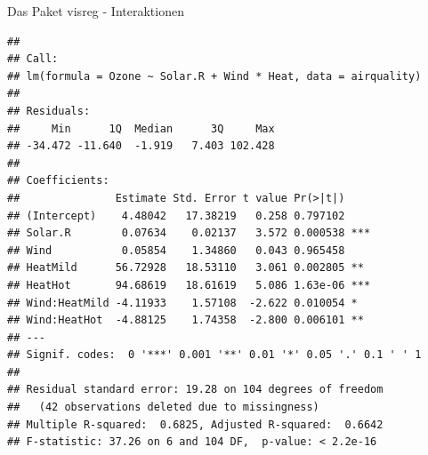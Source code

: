 \documentclass[ignorenonframetext,]{beamer}
\newenvironment{Shaded}{}{}
\newcommand{\KeywordTok}[1]{\textcolor[rgb]{0.00,0.44,0.13}{\textbf{{#1}}}}
\newcommand{\DataTypeTok}[1]{\textcolor[rgb]{0.56,0.13,0.00}{{#1}}}
\newcommand{\DecValTok}[1]{\textcolor[rgb]{0.25,0.63,0.44}{{#1}}}
\newcommand{\StringTok}[1]{\textcolor[rgb]{0.25,0.44,0.63}{{#1}}}
\newcommand{\NormalTok}[1]{{#1}}
\begin{document}
\begin{frame}[fragile]{Das Paket visreg - Interaktionen}

\begin{Shaded}
\end{Shaded}

\begin{verbatim}
## 
## Call:
## lm(formula = Ozone ~ Solar.R + Wind * Heat, data = airquality)
## 
## Residuals:
##     Min      1Q  Median      3Q     Max 
## -34.472 -11.640  -1.919   7.403 102.428 
## 
## Coefficients:
##               Estimate Std. Error t value Pr(>|t|)    
## (Intercept)    4.48042   17.38219   0.258 0.797102    
## Solar.R        0.07634    0.02137   3.572 0.000538 ***
## Wind           0.05854    1.34860   0.043 0.965458    
## HeatMild      56.72928   18.53110   3.061 0.002805 ** 
## HeatHot       94.68619   18.61619   5.086 1.63e-06 ***
## Wind:HeatMild -4.11933    1.57108  -2.622 0.010054 *  
## Wind:HeatHot  -4.88125    1.74358  -2.800 0.006101 ** 
## ---
## Signif. codes:  0 '***' 0.001 '**' 0.01 '*' 0.05 '.' 0.1 ' ' 1
## 
## Residual standard error: 19.28 on 104 degrees of freedom
##   (42 observations deleted due to missingness)
## Multiple R-squared:  0.6825, Adjusted R-squared:  0.6642 
## F-statistic: 37.26 on 6 and 104 DF,  p-value: < 2.2e-16
\end{verbatim}

\end{frame}
\end{document}
